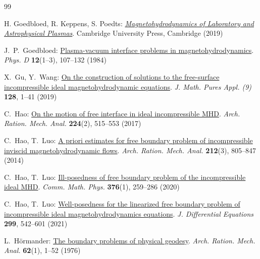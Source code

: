 \documentclass[twoside,11pt]{article}
\numberwithin{equation}{section}
\begin{document}
{\begin{thebibliography}{99}
		

			
			 H. Goedbloed, R. Keppens, S. Poedts: \href{https://doi.org/10.1017/9781316403679}{\it Magnetohydrodynamics of Laboratory and Astrophysical Plasmas}. Cambridge University Press, Cambridge (2019)
			
  J.~P.~Goedbloed: \href{https://doi.org/10.1016/0167-2789(84)90517-7}{Plasma-vacuum interface problems in magnetohydrodynamics}. {\it Phys. D} {\bf 12}(1--3), 107--132  (1984)			
			
  X.~Gu, Y.~Wang: \href{https://doi.org/10.1016/j.matpur.2019.06.004}{On the construction of solutions to the free-surface incompressible ideal magnetohydrodynamic equations}. {\it J. Math. Pures Appl. (9)} {\bf 128}, 1--41 (2019)			

 C.~Hao: \href{https://doi.org/10.1007/s00205-017-1082-7}{On the motion of free interface in ideal incompressible MHD}. {\it Arch. Ration. Mech. Anal.} {\bf 224}(2), 515--553 (2017)

 C.~Hao, T.~Luo: \href{https://doi.org/10.1007/s00205-013-0718-5}{A priori estimates for free boundary problem of incompressible inviscid magnetohydrodynamic flows}. {\it Arch. Ration. Mech. Anal.} {\bf 212}(3), 805--847 (2014)

  C.~Hao, T.~Luo: \href{https://doi.org/10.1007/s00220-019-03614-1}{Ill-posedness of free boundary problem of the incompressible ideal {MHD}}. {\it Comm. Math. Phys.} {\bf 376}(1), 259--286 (2020)

 C.~Hao, T.~Luo: \href{https://doi.org/10.1016/j.jde.2021.07.030}{Well-posedness for the linearized free boundary problem of incompressible ideal magnetohydrodynamics equations}. {\it J. Differential Equations} {\bf 299}, 542--601 (2021)
			
			
		 L.~H\"{o}rmander: \href{https://doi.org/10.1007/BF00251855}{The boundary problems of physical geodesy}. {\it Arch. Ration. Mech. Anal.} {\bf 62}(1), 1--52 (1976)	
			

\end{thebibliography}}
\end{document}
